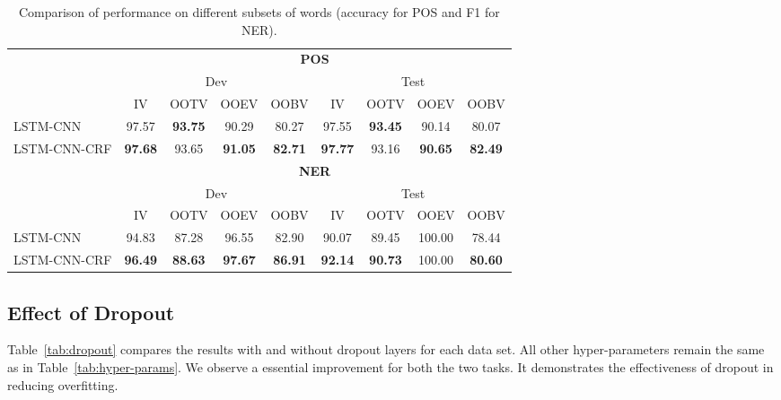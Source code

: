 \documentclass[11pt]{article}
\begin{document}
\begin{table*}
\centering
\begin{tabular}[t]{l|cccc|cccc}
\hline
 & \multicolumn{8}{c}{\textbf{POS}} \\
 \cline{2-9}
 & \multicolumn{4}{c|}{Dev} & \multicolumn{4}{c}{Test} \\
 \cline{2-9}
 & IV & OOTV & OOEV & OOBV & IV & OOTV & OOEV & OOBV \\
\hline
LSTM-CNN & 97.57 & \textbf{93.75} & 90.29 & 80.27 & 97.55 & \textbf{93.45} & 90.14 & 80.07 \\
LSTM-CNN-CRF & \textbf{97.68} & 93.65 & \textbf{91.05} & \textbf{82.71} & \textbf{97.77} & 93.16 & \textbf{90.65} & \textbf{82.49} \\
\hline
& \multicolumn{8}{c}{\textbf{NER}} \\
 \cline{2-9}
 & \multicolumn{4}{c|}{Dev} & \multicolumn{4}{c}{Test} \\
 \cline{2-9}
 & IV & OOTV & OOEV & OOBV & IV & OOTV & OOEV & OOBV \\
\hline
LSTM-CNN & 94.83 & 87.28 & 96.55 & 82.90 & 90.07 & 89.45 & 100.00 & 78.44 \\
LSTM-CNN-CRF & \textbf{96.49} & \textbf{88.63} & \textbf{97.67} & \textbf{86.91} & \textbf{92.14} & \textbf{90.73} & 100.00 & \textbf{80.60} \\
\hline
\end{tabular}
\caption{Comparison of performance on different subsets of words (accuracy for POS and F1 for NER).}
\label{tab:oov}
\end{table*}

\subsection{Effect of Dropout}
\label{subsec:dropout}
Table~\ref{tab:dropout} compares the results with and without dropout layers for each data set.
All other hyper-parameters remain the same as in Table~\ref{tab:hyper-params}. We observe a essential improvement for both the two tasks. It demonstrates the effectiveness of dropout in reducing overfitting.
\end{document}
